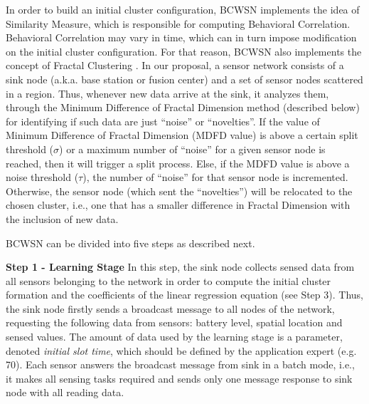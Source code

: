 \documentclass{acm_proc_article-sp}
\begin{document}
In order to build an initial cluster configuration, BCWSN implements the idea of
Similarity Measure, which is responsible for computing Behavioral Correlation.
Behavioral Correlation may vary in time, which can in turn impose modification
on the initial cluster configuration. For that reason, BCWSN also implements the
concept of Fractal Clustering \cite{Barbara2000}. In our proposal, a sensor
network consists of a sink node (a.k.a. base station or fusion center) and a set
of sensor nodes scattered in a region.
Thus, whenever new data arrive at the sink, it analyzes them, through the
Minimum Difference of Fractal Dimension method (described below) for identifying
if such data are just ``noise'' or ``novelties''. If the value of Minimum
Difference of Fractal Dimension (MDFD value) is above a certain split threshold
($\sigma$) or a maximum number of ``noise'' for a given sensor node is reached,
then it will trigger a split process. Else, if the MDFD value is above a noise
threshold ($\tau$), the number of ``noise'' for that sensor node is
incremented. Otherwise, the sensor node (which sent the ``novelties'') will be
relocated to the chosen cluster, i.e., one that has a smaller difference in
Fractal Dimension with the inclusion of new data.
\vspace*{-.3cm}


BCWSN can be divided into five steps as described next.
\vspace*{-.3cm}

{\bf Step 1 - Learning Stage}
In this step, the sink node collects sensed data from all sensors belonging to
the network in order to compute the initial cluster formation and the
coefficients of the linear regression equation (see Step 3). Thus, the sink 
node firstly sends a broadcast message to all
nodes of the network, requesting the following data from sensors:
battery level, spatial location and sensed values. The amount of data used by the
learning stage is a parameter, denoted \textit{initial slot time}, which should be
defined by the application expert (e.g. 70). Each sensor answers the broadcast
message from sink in a batch mode, i.e., it makes all sensing tasks required and
sends only one message response to sink node with all reading data.
\vspace*{-.3cm}
\end{document}
